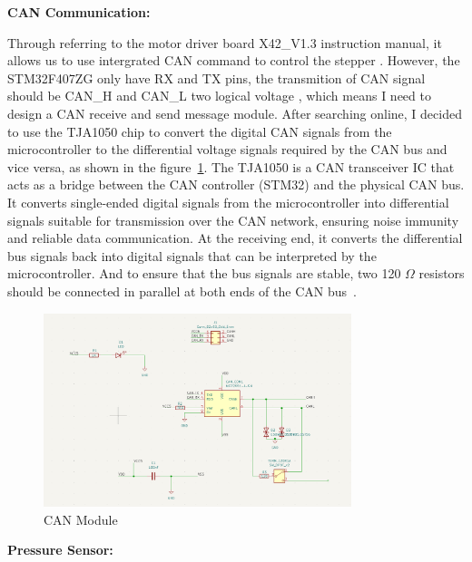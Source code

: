 \textbf{CAN Communication:} 
  
Through referring to the motor driver board X42\_V1.3 instruction manual, it allows us to use intergrated CAN command to control the stepper \cite{zhang2023csdn}. However, the STM32F407ZG only have RX and TX pins, the transmition of CAN signal should be CAN\_H and CAN\_L two logical voltage \cite{liu2024csdn}, which means I need to design a CAN receive and send message module. After searching online, I decided to use the TJA1050 chip to convert the digital CAN signals from the microcontroller to the differential voltage signals required by the CAN bus and vice versa, as shown in the figure~\ref{fig:can_module}.
The TJA1050 is a CAN transceiver IC that acts as a bridge between the CAN controller (STM32) and the physical CAN bus. It converts single-ended digital signals from the microcontroller into differential signals suitable for transmission over the CAN network, ensuring noise immunity and reliable data communication. At the receiving end, it converts the differential bus signals back into digital signals that can be interpreted by the microcontroller. And to ensure that the bus signals are stable, two 120 $\Omega$ resistors should be connected in parallel at both ends of the CAN bus~\cite{liu2024csdn}.
\begin{figure}[h]
    \centering
    \includegraphics[width=0.8\textwidth]{Figures/CAN_MODULE.png}
    \caption{CAN Module}
    \label{fig:can_module}
\end{figure}
  
\textbf{Pressure Sensor:} 
  
